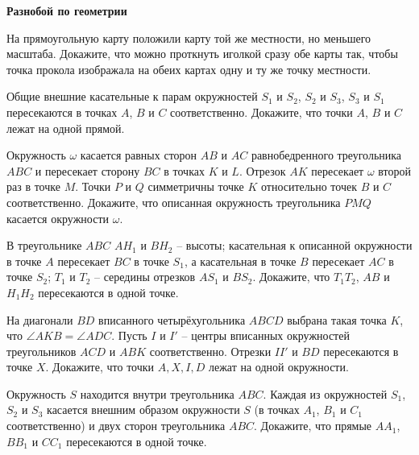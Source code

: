 \documentclass{article}
\begin{document}
    \large

    \begin{center}
        \textbf{Разнобой по геометрии}
    \end{center}

    \begin{enumerate_boxed}
        \item На прямоугольную карту положили карту той же местности, но меньшего масштаба.
        Докажите, что можно проткнуть иголкой сразу обе карты так, чтобы точка прокола изображала на обеих картах одну и ту же точку местности.

        \item Общие внешние касательные к парам окружностей $S_1$ и $S_2$, $S_2$ и $S_3$, $S_3$ и $S_1$ пересекаются в точках $A$, $B$ и $C$ соответственно.
        Докажите, что точки $A$, $B$ и $C$ лежат на одной прямой.

        \item Окружность $\omega$ касается равных сторон $AB$ и $AC$ равнобедренного треугольника $ABC$ и пересекает сторону $BC$ в точках $K$ и $L$.
        Отрезок $AK$ пересекает $\omega$ второй раз в точке $M$.
        Точки $P$ и $Q$ симметричны точке $K$ относительно точек $B$ и $C$ соответственно.
        Докажите, что описанная окружность треугольника $PMQ$ касается окружности $\omega$.

        \item В треугольнике $ABC$ $AH_1$ и $BH_2$ – высоты; касательная к описанной окружности в точке $A$ пересекает $BC$ в точке $S_1$, а касательная в точке $B$ пересекает $AC$ в точке $S_2$; $T_1$ и $T_2$ – середины отрезков $AS_1$ и $BS_2$.
        Докажите, что $T_{1}T_2$, $AB$ и $H_{1}H_2$ пересекаются в одной точке.

        \item На диагонали $BD$ вписанного четырёхугольника $ABCD$ выбрана такая точка $K$, что $\angle AKB = \angle ADC$.
        Пусть $I$ и $I'$ – центры вписанных окружностей треугольников $ACD$ и $ABK$ соответственно.
        Отрезки $II'$ и $BD$ пересекаются в точке $X$.
        Докажите, что точки $A, X, I, D$ лежат на одной окружности.

        \item Окружность $S$ находится внутри треугольника $ABC$.
        Каждая из окружностей $S_1$, $S_2$ и $S_3$ касается внешним образом окружности $S$ (в точках $A_1$, $B_1$ и $C_1$ соответственно) и двух сторон треугольника $ABC$.
        Докажите, что прямые $AA_1$, $BB_1$ и $CC_1$ пересекаются в одной точке.


\end{enumerate_boxed}
\end{document}
